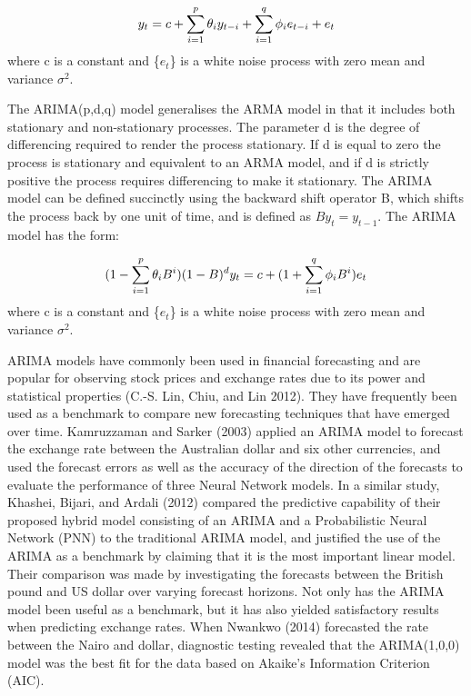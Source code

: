 \documentclass[12pt,a4paper]{article}
\numberwithin{equation}{section}
\numberwithin{figure}{section}
\numberwithin{table}{section}
\begin{document}
\[ 
    y_t = c + \sum_{i = 1}^{p} \theta_{i} y_{t-i} + \sum_{i = 1}^{q} \phi_{i} e_{t-i}+ e_t \label{eq1} \\ \notag
\] where c is a constant and \{\(e_t\)\} is a white noise process with
zero mean and variance \(\sigma^2\).

The ARIMA(p,d,q) model generalises the ARMA model in that it includes
both stationary and non-stationary processes. The parameter d is the
degree of differencing required to render the process stationary. If d
is equal to zero the process is stationary and equivalent to an ARMA
model, and if d is strictly positive the process requires differencing
to make it stationary. The ARIMA model can be defined succinctly using
the backward shift operator B, which shifts the process back by one unit
of time, and is defined as \(By_t = y_{t-1}\). The ARIMA model has the
form:

\[ 
    (1-\sum_{i = 1}^{p} \theta_{i} B^i)(1-B)^dy_t = c + (1 + \sum_{i = 1}^{q} \phi_{i} B^i)e_t \label{eq2} \\ \notag 
\] where c is a constant and \{\(e_t\)\} is a white noise process with
zero mean and variance \(\sigma^2\).

ARIMA models have commonly been used in financial forecasting and are
popular for observing stock prices and exchange rates due to its power
and statistical properties (C.-S. Lin, Chiu, and Lin 2012). They have
frequently been used as a benchmark to compare new forecasting
techniques that have emerged over time. Kamruzzaman and Sarker (2003)
applied an ARIMA model to forecast the exchange rate between the
Australian dollar and six other currencies, and used the forecast errors
as well as the accuracy of the direction of the forecasts to evaluate
the performance of three Neural Network models. In a similar study,
Khashei, Bijari, and Ardali (2012) compared the predictive capability of
their proposed hybrid model consisting of an ARIMA and a Probabilistic
Neural Network (PNN) to the traditional ARIMA model, and justified the
use of the ARIMA as a benchmark by claiming that it is the most
important linear model. Their comparison was made by investigating the
forecasts between the British pound and US dollar over varying forecast
horizons. Not only has the ARIMA model been useful as a benchmark, but
it has also yielded satisfactory results when predicting exchange rates.
When Nwankwo (2014) forecasted the rate between the Nairo and dollar,
diagnostic testing revealed that the ARIMA(1,0,0) model was the best fit
for the data based on Akaike's Information Criterion (AIC).
\end{document}

